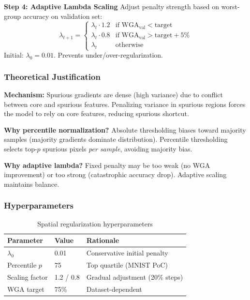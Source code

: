 \textbf{Step 4: Adaptive Lambda Scaling}
Adjust penalty strength based on worst-group accuracy on validation set:
\begin{equation}
\lambda_{t+1} = \begin{cases}
\lambda_t \cdot 1.2 & \text{if } \text{WGA}_{\text{val}} < \text{target} \\
\lambda_t \cdot 0.8 & \text{if } \text{WGA}_{\text{val}} > \text{target} + 5\% \\
\lambda_t & \text{otherwise}
\end{cases}
\end{equation}
Initial: $\lambda_0 = 0.01$. Prevents under/over-regularization.

\subsubsection{Theoretical Justification}

\textbf{Mechanism:} Spurious gradients are dense (high variance) due to conflict between core and spurious features. Penalizing variance in spurious regions forces the model to rely on core features, reducing spurious shortcut.

\textbf{Why percentile normalization?} Absolute thresholding biases toward majority samples (majority gradients dominate distribution). Percentile thresholding selects top-$p$ spurious pixels \emph{per sample}, avoiding majority bias.

\textbf{Why adaptive lambda?} Fixed penalty may be too weak (no WGA improvement) or too strong (catastrophic accuracy drop). Adaptive scaling maintains balance.

\subsubsection{Hyperparameters}

\begin{table}[h]
\centering
\caption{Spatial regularization hyperparameters}
\label{tab:hyperparams}
\begin{tabular}{lll}
\toprule
Parameter & Value & Rationale \\
\midrule
$\lambda_0$ & 0.01 & Conservative initial penalty \\
Percentile $p$ & 75 & Top quartile (MNIST PoC) \\
Scaling factor & 1.2 / 0.8 & Gradual adjustment (20\% steps) \\
WGA target & 75\% & Dataset-dependent \\
\bottomrule
\end{tabular}
\end{table}

